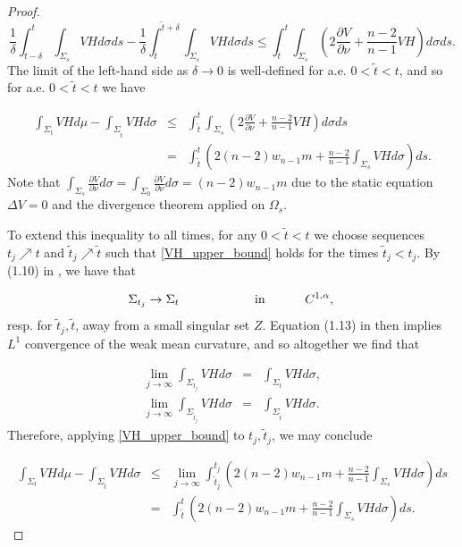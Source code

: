 \documentclass[12pt,twoside]{article}
\theoremstyle{plain}
\theoremstyle{definition}
\theoremstyle{remark}
\renewcommand{\tilde}{\widetilde}
\numberwithin{equation}{section}
\begin{document}
\begin{proof}
\begin{equation*}
    \frac{1}{\delta} \int_{t - \delta}^{t} \int_{\Sigma_{s}} VH d\sigma ds - \frac{1}{\delta} \int_{\tilde{t}}^{\tilde{t}+\delta} \int_{\Sigma_{s}} VH d\sigma ds \leq \int_{\tilde{t}}^{t} \int_{\Sigma_{s}} \left( 2 \frac{\partial V}{\partial \nu} + \frac{n-2}{n-1} VH \right) d\sigma ds.
\end{equation*}
The limit of the left-hand side as $\delta \rightarrow 0$ is well-defined for a.e. $0 < \tilde{t} < t$, and so for a.e. $0 < \tilde{t} < t$ we have

\begin{eqnarray}
    \int_{\Sigma_{t}} VH d\mu - \int_{\Sigma_{\tilde{t}}} VH d\sigma &\leq& \int_{\tilde{t}}^{t} \int_{\Sigma_{s}} \left( 2 \frac{\partial V}{\partial \nu} + \frac{n-2}{n-1} VH \right) d\sigma ds \nonumber \\
    &=& \int_{\tilde{t}}^{t} \left( 2(n-2) w_{n-1}m + \frac{n-2}{n-1}  \int_{\Sigma_{s}}VH d\sigma \right) ds \label{VH_upper_bound}.
\end{eqnarray}
Note that $\int_{\Sigma_{s}} \frac{\partial V}{\partial \nu} d\sigma = \int_{\Sigma_{0}} \frac{\partial V}{\partial \nu} d \sigma = (n-2)w_{n-1} m$ due to the static equation $\Delta V = 0$ and the divergence theorem applied on $\Omega_{s}$. 

To extend this inequality to all times, for any $0 < \tilde{t} < t$ we choose sequences $t_{j} \nearrow t$ and $\tilde{t}_{j} \nearrow \tilde{t}$ such that \eqref{VH_upper_bound} holds for the times $\tilde{t}_{j} < t_{j}$. By (1.10) in \cite{HI}, we have that 

\begin{equation*}
    \Sigma_{t_{j}} \rightarrow \Sigma_{t} \hspace{2cm} \text{  in  } \hspace{1cm} C^{1,\alpha}, \\
\end{equation*}
resp. for $\tilde{t}_{j},\tilde{t}$, away from a small singular set $Z$. Equation (1.13) in \cite{HI} then implies $L^{1}$ convergence of the weak mean curvature, and so altogether we find that

\begin{eqnarray*}
    \lim_{j \rightarrow \infty} \int_{\Sigma_{t_{j}}} VH d\sigma &=& \int_{\Sigma_{t}} VH d\sigma, \\
    \lim_{j \rightarrow \infty} \int_{\Sigma_{\tilde{t}_{j}}} VH d\sigma &=& \int_{\Sigma_{\tilde{t}}} VH d\sigma.
\end{eqnarray*}
Therefore, applying \eqref{VH_upper_bound} to $t_{j}, \tilde{t}_{j}$, we may conclude

\begin{eqnarray*}
    \int_{\Sigma_{t}} VH d\mu - \int_{\Sigma_{\tilde{t}}} VH d\sigma &\leq& \lim_{j \rightarrow \infty} \int_{\tilde{t}_{j}}^{t_{j}} \left( 2(n-2) w_{n-1}m + \frac{n-2}{n-1}  \int_{\Sigma_{s}}VH d\sigma \right) ds \\
    &=& \int_{\tilde{t}}^{t} \left( 2(n-2) w_{n-1}m + \frac{n-2}{n-1}  \int_{\Sigma_{s}}VH d\sigma \right) ds.
\end{eqnarray*}
\end{proof}
\end{document}
